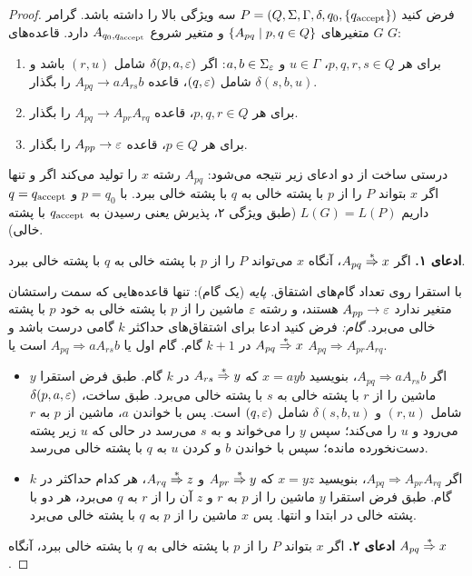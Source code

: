 \begin{proof}
فرض کنید $P=(Q,\Sigma,\Gamma,\delta,q_0,\{\qacc\})$ سه ویژگی بالا را داشته باشد. گرامر $G$ متغیرهای $\{A_{pq}\st p,q\in Q\}$ و متغیر شروع $A_{q_0,\qacc}$ دارد. قاعده‌های $G$:
\begin{enumerate}
\item برای هر $p,q,r,s\in Q$، $u\in\Gamma$ و $a,b\in\Sigma_\eps$: اگر $\delta(p,a,\eps)$ شامل $(r,u)$ باشد و $\delta(s,b,u)$ شامل $(q,\eps)$، قاعده $A_{pq}\to aA_{rs}b$ را بگذار.
\item برای هر $p,q,r\in Q$، قاعده $A_{pq}\to A_{pr}A_{rq}$ را بگذار.
\item برای هر $p\in Q$، قاعده $A_{pp}\to\eps$ را بگذار.
\end{enumerate}
درستی ساخت از دو ادعای زیر نتیجه می‌شود: $A_{pq}$ رشته $x$ را تولید می‌کند اگر و تنها اگر $x$ بتواند $P$ را از $p$ با پشته خالی به $q$ با پشته خالی ببرد. با $p=q_0$ و $q=\qacc$ داریم $L(G)=L(P)$ (طبق ویژگی ۲، پذیرش یعنی رسیدن به $\qacc$ با پشته خالی).

\textbf{ادعای ۱.} اگر $A_{pq}\der x$، آنگاه $x$ می‌تواند $P$ را از $p$ با پشته خالی به $q$ با پشته خالی ببرد.

با استقرا روی تعداد گام‌های اشتقاق.
\emph{پایه} (یک گام): تنها قاعده‌هایی که سمت راستشان متغیر ندارد $A_{pp}\to\eps$ هستند، و رشته $\eps$ ماشین را از $p$ با پشته خالی به خود $p$ با پشته خالی می‌برد.
\emph{گام:} فرض کنید ادعا برای اشتقاق‌های حداکثر $k$ گامی درست باشد و $A_{pq}\der x$ در $k+1$ گام. گام اول یا $A_{pq}\Rightarrow aA_{rs}b$ است یا $A_{pq}\Rightarrow A_{pr}A_{rq}$.
\begin{itemize}
\item اگر $A_{pq}\Rightarrow aA_{rs}b$، بنویسید $x=ayb$ که $A_{rs}\der y$ در $k$ گام. طبق فرض استقرا $y$ ماشین را از $r$ با پشته خالی به $s$ با پشته خالی می‌برد. طبق ساخت، $\delta(p,a,\eps)$ شامل $(r,u)$ و $\delta(s,b,u)$ شامل $(q,\eps)$ است. پس با خواندن $a$، ماشین از $p$ به $r$ می‌رود و $u$ را  می‌کند؛ سپس $y$ را می‌خواند و به $s$ می‌رسد در حالی که $u$ زیر پشته دست‌نخورده مانده؛ سپس با خواندن $b$ و  کردن $u$ به $q$ با پشته خالی می‌رسد.
\item اگر $A_{pq}\Rightarrow A_{pr}A_{rq}$، بنویسید $x=yz$ که $A_{pr}\der y$ و $A_{rq}\der z$، هر کدام حداکثر در $k$ گام. طبق فرض استقرا $y$ ماشین را از $p$ به $r$ و $z$ آن را از $r$ به $q$ می‌برد، هر دو با پشته خالی در ابتدا و انتها. پس $x$ ماشین را از $p$ به $q$ با پشته خالی می‌برد.
\end{itemize}

\textbf{ادعای ۲.} اگر $x$ بتواند $P$ را از $p$ با پشته خالی به $q$ با پشته خالی ببرد، آنگاه $A_{pq}\der x$.


\end{proof}
